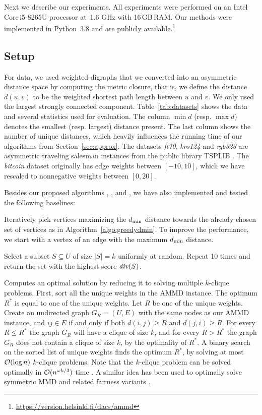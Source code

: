 Next we describe our experiments.
All experiments were performed on an Intel\,Core\,i5-8265U processor at~1.6 GHz with 16\,GB\,RAM. 
Our methods were implemented in Python~3.8 and are publicly available.\footnote{\url{https://version.helsinki.fi/dacs/ammd}}


\subsection{Setup}

For data, we used weighted digraphs that we converted into an asymmetric distance space by computing the metric closure, that is, we define the distance $d(u, v)$ to be 
the weighted shortest path length between $u$ and $v$. We only used the largest strongly connected component.
Table~\ref{tab:datasets} shows the data and several statistics used for evaluation.
The column $\min d$ (resp. $\max d$) denotes the smallest (resp.
largest) distance present. The last column shows the
number of unique distances, which heavily
influences the running time of our algorithms from Section~\ref{sec:approx}.
The datasets \emph{ft70}, \emph{kro124} and \emph{rgb323} are asymmetric traveling salesman instances from the public library TSPLIB \cite{tsplib}. The \emph{bitcoin} dataset originally has edge weights between $[-10,10]$, which we have rescaled to nonnegative weights between $[0,20]$.

 Besides our proposed algorithms \algbac{},
\algbacb{}, and \algbacf{}, we have also implemented
and tested the following baselines: 

 Iteratively pick vertices maximizing the $d_{\text{min}}$ distance towards the already chosen set of vertices as in Algorithm~\ref{algo:greedydmin}. To improve the performance, we start with a vertex of an edge with the maximum $d_{\text{min}}$ distance.

 Select a subset $S \subseteq U$ of size $|S|=k$ uniformly at random. Repeat 10 times and return the set with the highest score $\diver{S}$.

 Computes an optimal solution by reducing it to solving multiple $k$-clique problems. First, sort all the unique weights in the AMMD instance.
The optimum $R^*$ is equal to one of the unique weights.
Let $R$ be one of the unique weights. Create an undirected graph $G_R = (U, E)$ with the same nodes as our AMMD instance, and $ij \in E$ if and only if both $d(i,j) \geq R$ and $d(j, i) \geq R$.
For every $R \leq R^*$ the graph $G_R$ will have a clique of size $k$, and for every $R>R^*$ the graph $G_R$ does not contain a clique of size $k$, by the optimality of $R^*$.
A binary search on the sorted list of unique weights finds the optimum $R^*$, by solving at most $\mathcal{O}(\log n)$ $k$-clique problems.
Note that the $k$-clique problem can be solved optimally in $\mathcal{O}(n^{\omega k/3})$ time \cite{nevsetvril1985complexity}. 
A similar idea has been used to optimally solve symmetric MMD and related fairness variants \cite{akagi2018exact,wang2023max}.



